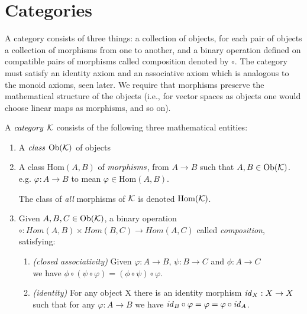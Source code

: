 \documentclass[10pt, oneside, reqno]{amsart}
\begin{document}
\section{Categories} %
\label{sec:categories}
A category consists of three things:
a collection of objects, for each pair of objects a collection of morphisms from one to another, and a binary
operation defined on compatible pairs of morphisms called composition denoted by $\circ$. The category must satisfy an identity axiom
and an associative axiom which is analogous to the monoid axioms, seen later. We require that morphisms preserve the
mathematical structure of the objects (i.e., for vector spaces as objects one would choose linear maps as morphisms, and so on).
\begin{defn}[Category]
	A $\emph{category}$ $\mathcal{K}$ consists of the following three mathematical entities:
	\begin{enumerate}
		\item A $\emph{class}$ $\text{Ob}(\mathcal{K})$ of objects
		
		\item A class $\text{Hom}(A,B)$ of $\emph{morphisms}$, from $A \longrightarrow B$ such that $A, B \in \text{Ob}(\mathcal{K})$.
		\\
		e.g. $\varphi : A \to B$ to mean $\varphi \in \text{Hom}(A,B)$.
		\begin{rem}
		The class of \emph{all} morphisms of $\mathcal{K}$ is denoted $\text{Hom}(\mathcal{K})$.
		\end{rem}

		\item Given $A, B, C \in \text{Ob}(\mathcal{K})$, a binary operation $\circ : Hom(A,B) \times Hom(B,C) \to Hom(A,C)$ called
		\emph{composition}, satisfying:
		\begin{enumerate}
			\item \emph{(closed associativity)} Given $\varphi : A \to B$, $\psi: B \to C$ and $\phi: A \to C$
			\\
			we have $\phi \circ (\psi \circ \varphi) = (\phi \circ \psi) \circ \varphi$.
			\\
			
			\item \emph{(identity)} For any object X there is an identity morphism $\mathit{id}_{X} : X \to X$ such that for any $\varphi: A \to B$ we have $\mathit{id}_{B} \circ \varphi = \varphi = \varphi \circ \mathit{id}_{A}$.
			\\
		\end{enumerate}
	\end{enumerate}
\end{defn}
\end{document}
